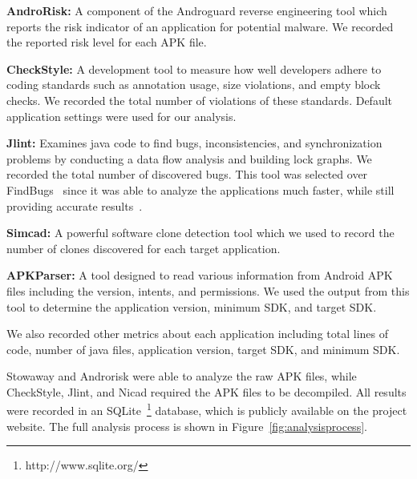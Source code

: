 \documentclass[conference]{IEEEtran}
\newcommand{\todo}[1]{\textcolor{cyan}{\textbf{[#1]}}}
\begin{document}
 \textbf{AndroRisk\cite{androguard_url}:} A component of the Androguard reverse engineering tool which reports the risk indicator of an application for potential malware. We recorded the reported risk level for each APK file.

 \textbf{CheckStyle\cite{checkstyle_key}:} A development tool to measure how well developers adhere to coding standards such as annotation usage, size violations, and empty block checks. We recorded the total number of violations of these standards. Default application settings were used for our analysis.

 \textbf{Jlint\cite{jlint_key}:} Examines java code to find bugs, inconsistencies, and synchronization problems by conducting a data flow analysis and building lock graphs. We recorded the total number of discovered bugs. This tool was selected over FindBugs~\cite{findbugs_key} since it was able to analyze the applications much faster, while still providing accurate results~\cite{rutar2004comparison}.

 \textbf{Simcad\cite{6613857}:} A powerful software clone detection tool which we used to record the number of clones discovered for each target application.

 \textbf{APKParser\cite{apkparser_link}:} A tool designed to read various information from Android APK files including the version, intents, and permissions. We used the output from this tool to determine the application version, minimum SDK, and target SDK. 
 
We also recorded other metrics about each application including total lines of code, number of java files, application version, target SDK, and minimum SDK.



Stowaway and Androrisk were able to analyze the raw APK files, while CheckStyle, Jlint, and Nicad required the APK files to be decompiled. All results were recorded in an SQLite~\footnote{http://www.sqlite.org/} database, which is publicly available on the project website. The full analysis process is shown in Figure~\ref{fig:analysisprocess}.
\end{document}
